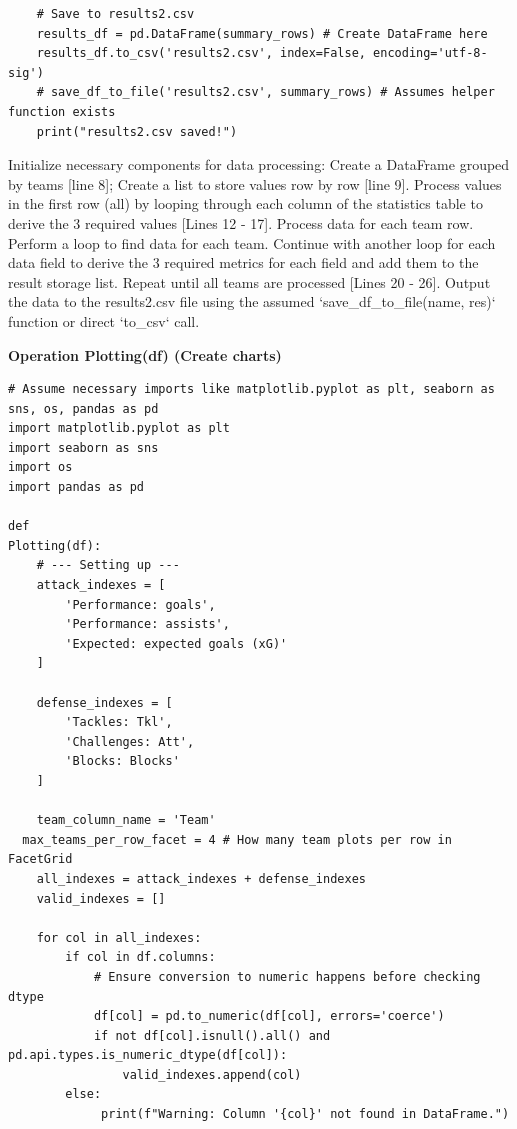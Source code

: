 \documentclass[12pt]{report}
\begin{document}
{{\begin{lstlisting}
    # Save to results2.csv
    results_df = pd.DataFrame(summary_rows) # Create DataFrame here
    results_df.to_csv('results2.csv', index=False, encoding='utf-8-sig')
    # save_df_to_file('results2.csv', summary_rows) # Assumes helper function exists
    print("results2.csv saved!")
\end{lstlisting}

Initialize necessary components for data processing: Create a DataFrame grouped by teams [line 8]; Create a list to store values row by row [line 9]. Process values in the first row (all) by looping through each column of the statistics table to derive the 3 required values [Lines 12 - 17]. Process data for each team row. Perform a loop to find data for each team. Continue with another loop for each data field to derive the 3 required metrics for each field and add them to the result storage list. Repeat until all teams are processed [Lines 20 - 26]. Output the data to the results2.csv file using the assumed `save\_df\_to\_file(name, res)` function or direct `to\_csv` call.

\textbf* {Operation Plotting(df) (Create charts)} %
\begin{lstlisting}
# Assume necessary imports like matplotlib.pyplot as plt, seaborn as sns, os, pandas as pd
import matplotlib.pyplot as plt
import seaborn as sns
import os
import pandas as pd

def
Plotting(df):
    # --- Setting up ---
    attack_indexes = [
        'Performance: goals',
        'Performance: assists',
        'Expected: expected goals (xG)'
    ]

    defense_indexes = [
        'Tackles: Tkl',
        'Challenges: Att',
        'Blocks: Blocks'
    ]

    team_column_name = 'Team'
  max_teams_per_row_facet = 4 # How many team plots per row in FacetGrid
    all_indexes = attack_indexes + defense_indexes
    valid_indexes = []

    for col in all_indexes:
        if col in df.columns:
            # Ensure conversion to numeric happens before checking dtype
            df[col] = pd.to_numeric(df[col], errors='coerce')
            if not df[col].isnull().all() and pd.api.types.is_numeric_dtype(df[col]):
                valid_indexes.append(col)
        else:
             print(f"Warning: Column '{col}' not found in DataFrame.")



\end{lstlisting}}}
\end{document}

